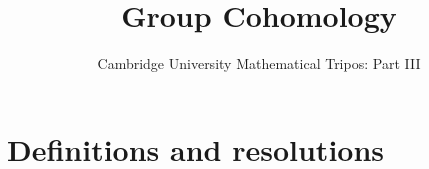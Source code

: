 \documentclass{article}
\title{Group Cohomology}
\author{Cambridge University Mathematical Tripos: Part III}
\begin{document}
\maketitle

\tableofcontentsnewpage{}

\section{Definitions and resolutions}


\end{document}
